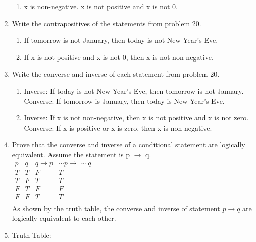\documentclass{article}
\makeatletter
\newcommand\setItemnumber[1]{\setcounter{enum\romannumeral\@enumdepth}{\numexpr#1-1\relax}}
\makeatother
\begin{document}
\begin{enumerate}
\begin{enumerate}
      \item x is non-negative. x is not positive and x is not 0.
  \end{enumerate}
  \setItemnumber{22}
  \item Write the contrapositives of the statements from problem 20.
  \begin{enumerate}
      \setItemnumber{2}
      \item If tomorrow is not January, then today is not New Year's Eve.
      \setItemnumber{5}
      \item If x is not positive and x is not 0, then x is not non-negative.
  \end{enumerate}
  \item Write the converse and inverse of each statement from problem 20.
  \begin{enumerate}
      \setItemnumber{2}
      \item Inverse: If today is not New Year's Eve, then tomorrow is not January. \\
      Converse: If tomorrow is January, then today is New Year's Eve.
      \setItemnumber{5}
      \item Inverse: If x is not non-negative, then x is not positive and x is not zero.\\
      Converse: If x is positive or x is zero, then x is non-negative.
  \end{enumerate}
  \setItemnumber{27}
  \item Prove that the converse and inverse of a conditional statement are logically equivalent. Assume the statement is p $\rightarrow$ q.\\
  \begin{math} 
  \begin{array}{|cc|c|c|}
    p&q& q \rightarrow p &\sim p \rightarrow \sim q \\
    \hline
    T&T &F &T\\
    T&F &T &T\\
    F&T &F &F \\
    F&F &T &T\\
  \end{array}
  \end{math}
  \\
  As shown by the truth table, the converse and inverse of statement $p \rightarrow q$ are logically equivalent to each other.
  \setItemnumber{30}
  \item Truth Table: \\
  \\
  \begin{tabular}{|c|c|c|c|c|c|}


\end{tabular}
\end{enumerate}
\end{document}
